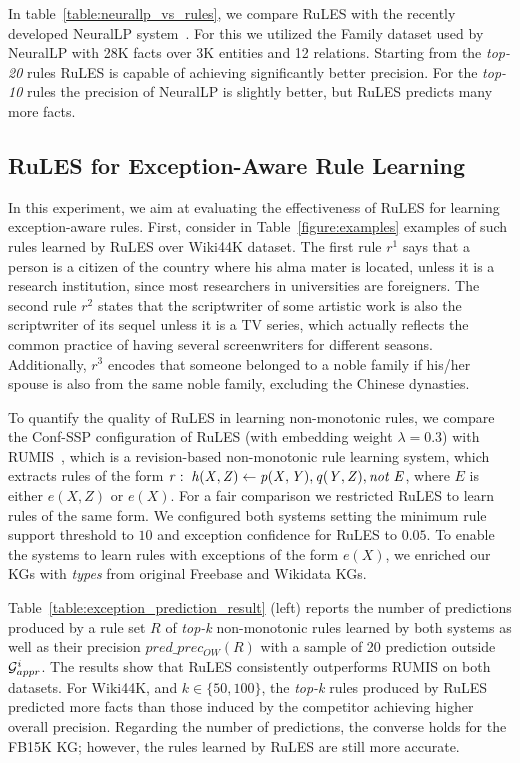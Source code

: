 In table~\ref{table:neurallp_vs_rules}, we compare RuLES with the recently developed NeuralLP system~\cite{DBLP:conf/nips/YangYC17}. For this we 
utilized the Family dataset used by NeuralLP 
with 28K facts over 3K entities and 12 relations. 
Starting from the \textit{top-20} rules RuLES is capable of achieving significantly better precision. For the \textit{top-10} rules the precision of NeuralLP is slightly better, but RuLES predicts many more facts.


\subsection{RuLES for Exception-Aware Rule Learning}
In this experiment, we aim at evaluating the effectiveness of RuLES 
for learning exception-aware rules.
First, consider in Table~\ref{figure:examples} examples of such rules learned by RuLES over Wiki44K dataset. 
 The first rule $r^1$ says that a person is a citizen of the country where his alma mater is located, unless it is a research institution, 
since most 
researchers in universities are foreigners. The second rule $r^2$ states that the scriptwriter of some artistic work is also the scriptwriter of its sequel unless it is a TV series, which actually reflects the common practice of having several screenwriters for different seasons. Additionally, $r^3$ encodes that someone belonged to a 
noble family if his/her 
spouse is also from the same noble family, excluding the Chinese dynasties. 

To quantify the quality of RuLES in learning non-monotonic rules, we compare the Conf-SSP configuration of RuLES (with embedding weight $\lambda = 0.3$) with RUMIS~\cite{trantowards}, which is a revision-based 
non-monotonic rule 
learning system, which 
extracts rules 
of the form  
$\mathit{r:\;h(X,Z) \leftarrow p(X,Y), q(Y,Z), not\; E}$, where $E$ is either $e(X,Z)$ or 
$e(X)$.
For a fair comparison we restricted RuLES to learn rules of the same form.   
We configured both systems 
setting the minimum rule support threshold to 
$10$ and exception confidence for RuLES to $0.05$. 
To enable the systems to 
learn rules with exceptions of the form 
$e(X)$, we enriched 
our KGs with \textit{types} 
from original Freebase and Wikidata KGs. 






Table~\ref{table:exception_prediction_result} (left) reports the number of predictions produced by a rule set $R$ of 
\textit{top-k} non-monotonic rules learned 
by both systems as well as 
their precision $pred\_prec_{OW}(R)$ with a sample of 20 prediction outside $\mathcal{G}^i_{appr}$. The results show that RuLES consistently outperforms RUMIS 
on both datasets. For Wiki44K, and $k\in\{50,100\}$, the \textit{top-k} rules produced by RuLES predicted more facts than those induced by the competitor 
achieving higher overall precision. 
Regarding the number of predictions, the converse holds for the FB15K KG; however, the rules learned by RuLES are still more accurate.


